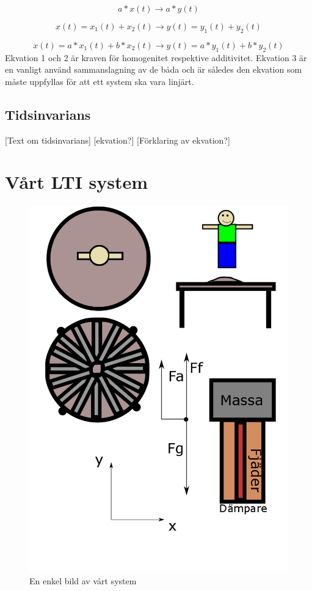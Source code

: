 \documentclass[10pt,a4paper]{article}
\begin{document}
\begin{equation}
a*x(t) \rightarrow a*y(t) 
\end{equation}

\begin{equation}
x(t) = x_1(t) + x_2(t) \rightarrow y(t) = y_1(t) + y_2(t)
\end{equation}

\begin{equation}
x(t) = a*x_1(t) + b*x_2(t)\rightarrow y(t) = a*y_1(t) + b*y_2(t)
\end{equation}
\linebreak
Ekvation 1 och 2 är kraven för homogenitet respektive additivitet. Ekvation 3 är en vanligt använd sammanslagning av de båda och är således den ekvation som måste uppfyllas för att ett system ska vara linjärt.

\subsection{Tidsinvarians}

[Text om tidsinvarians]
[ekvation?]
[Förklaring av ekvation?]

\newpage
\section{Vårt LTI system}

\begin{figure}[ht]
\caption{En enkel bild av vårt system}
\includegraphics[scale=0.4]{Bild}
\end{figure}
\clearpage
\end{document}
